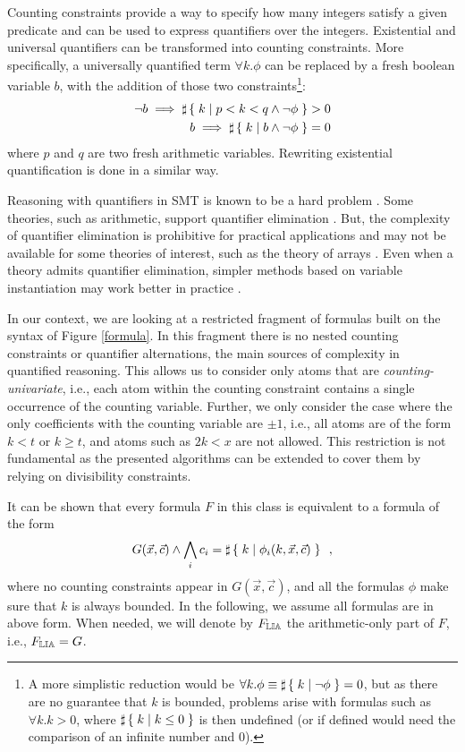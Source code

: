 Counting constraints provide a way to specify how many integers
satisfy a given predicate and can be used to
express quantifiers over the integers. Existential and universal quantifiers can
be transformed into counting constraints. More specifically, a universally
quantified term $\forall k . \phi$ can be replaced by a fresh boolean variable
$b$, with the addition of those two constraints\footnote{A more simplistic reduction would be
  $\forall k . \phi \equiv \sharp\left\lbrace\;k\;|\;\lnot \phi\;\right\rbrace = 0$, but as there are no guarantee
  that $k$ is bounded, problems arise with formulas such as $\forall k . k > 0$,
  where $\sharp\left\lbrace\;k\;|\;k\leq 0\;\right\rbrace$ is then undefined (or if defined would need the
  comparison of an infinite number and $0$).}:
\begin{align*}
  \lnot b \implies \sharp\left\lbrace\;k\;|\;p < k < q \land \lnot \phi\;\right\rbrace > 0 \\
  b \implies \sharp\left\lbrace\;k\;|\;b \land \lnot \phi\;\right\rbrace = 0
\end{align*}
 where $p$ and $q$ are two fresh arithmetic variables. Rewriting existential
 quantification is done in a similar way.

Reasoning with quantifiers in SMT is known to be a hard problem
\cite{ge2010solving,weispfenning1988complexity}. Some theories, such
as arithmetic, support quantifier elimination \cite{cooper}. But, the
complexity of quantifier elimination is prohibitive for practical
applications and may not be available for some theories of interest,
such as the theory of arrays \cite{bradley2006s}. Even when a theory
admits quantifier elimination,  simpler methods based on variable
instantiation may work better in practice \cite{dutertre2015solving}.

In our context, we are looking at a restricted fragment of formulas
built on the syntax of Figure \ref{formula}. In this fragment there is
no nested counting constraints or quantifier alternations, the main
sources of complexity in quantified reasoning. This allows us to
consider only atoms that are \emph{counting-univariate}, i.e., each
atom within the counting constraint contains a single occurrence of
the counting variable. Further, we only consider the case where the
only coefficients with the counting variable are $\pm 1$, i.e., 
all atoms are of the form $k < t$ or $k \geq t$, and atoms such as $2k <
x$ are not allowed. This restriction is not fundamental as the
presented algorithms can be extended to cover them by relying on
divisibility constraints.

It can be shown that every formula $F$ in this class is equivalent to a
formula of the form
\begin{equation}
\label{maingoal}
G(\vec{x}, \vec{c}) \land \bigwedge_i c_i = \sharp\left\lbrace\;k\;|\;\phi_i(k, \vec{x}, \vec{c})\;\right\rbrace\enspace,
\end{equation}
where no counting constraints appear in $G(\vec{x}, \vec{c})$, and all the formulas $\phi$
make sure that $k$ is always bounded. In the following, we assume all
formulas are in above form. When needed, we will denote by $F_{\mathbb{LIA}}$
the arithmetic-only part of $F$, i.e., $F_{\mathbb{LIA}} = G$.

